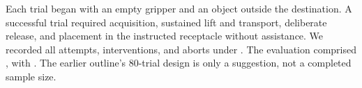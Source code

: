 Each trial began with an empty gripper and an object outside the destination. A successful trial required acquisition, sustained lift and transport, deliberate release, and placement in the instructed receptacle without assistance. We recorded all attempts, interventions, and aborts under . The evaluation comprised , with . The earlier outline's 80-trial design is only a suggestion, not a completed sample size.
